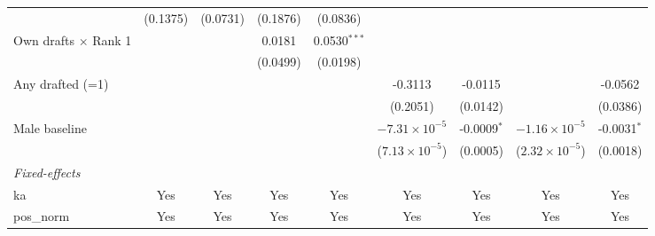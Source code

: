 \begin{table}[htbp]
\begin{threeparttable}
\begin{tabular}{lcccccccc}
                               & (0.1375)                    & (0.0731)                  & (0.1876)                    & (0.0836)                  &                                     &                                     &                                     &   \\   
   Own drafts $\times$ Rank 1  &                             &                           & 0.0181                      & 0.0530$^{***}$            &                                     &                                     &                                     &   \\   
                               &                             &                           & (0.0499)                    & (0.0198)                  &                                     &                                     &                                     &   \\   
   Any drafted (=1)            &                             &                           &                             &                           & -0.3113                             & -0.0115                             &                                     & -0.0562\\   
                               &                             &                           &                             &                           & (0.2051)                            & (0.0142)                            &                                     & (0.0386)\\   
   Male baseline               &                             &                           &                             &                           & $-7.31\times 10^{-5}$               & -0.0009$^{*}$                       & $-1.16\times 10^{-5}$               & -0.0031$^{*}$\\   
                               &                             &                           &                             &                           & ($7.13\times 10^{-5}$)              & (0.0005)                            & ($2.32\times 10^{-5}$)              & (0.0018)\\   
   \midrule
   \emph{Fixed-effects}\\
   ka                          & Yes                         & Yes                       & Yes                         & Yes                       & Yes                                 & Yes                                 & Yes                                 & Yes\\  
   pos\_norm                   & Yes                         & Yes                       & Yes                         & Yes                       & Yes                                 & Yes                                 & Yes                                 & Yes\\  

\end{tabular}
\end{threeparttable}
\end{table}
